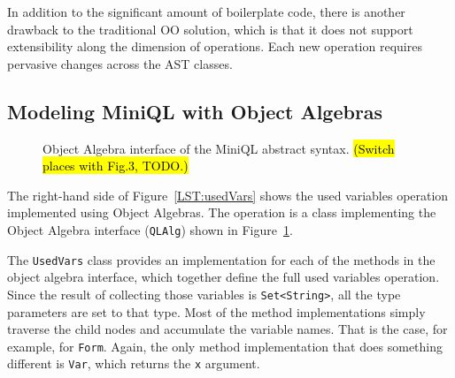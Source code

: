 
In addition to the significant amount of boilerplate code, there is
another drawback to the traditional OO solution, which is that it does
not support extensibility along the dimension of operations. Each new
operation requires pervasive changes across the AST classes.


\subsection{Modeling MiniQL with Object Algebras}\label{subsec:model_ql_with_oa}

\begin{figure}[t]
\nocaptionrule
\caption{Object Algebra interface of the MiniQL abstract syntax. \hl{(Switch places with Fig.3, TODO.)}}
\vspace{-.1in}
\label{ql_tree}
\end{figure}

The right-hand side of Figure~\ref{LST:usedVars} shows the used
variables operation implemented using Object Algebras. The operation
is a class implementing the Object Algebra interface
(\lstinline{QLAlg}) shown in Figure~\ref{ql_tree}.


The \lstinline{UsedVars} class provides an implementation for each
of the methods in the object algebra interface, which together define the
full used variables operation. Since the result of collecting those
variables is \lstinline{Set<String>}, all the type parameters are set to
that type. Most of the method implementations simply traverse the
child nodes and accumulate the variable names. That is the case, for
example, for \lstinline{Form}. Again, the only method implementation that does
something different is \lstinline{Var}, which returns the \lstinline{x}
argument.

